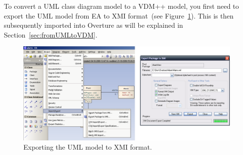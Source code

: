 To convert a UML class diagram model to a VDM++ model, you first need
to export the UML model from EA to XMI format~(see Figure~\ref{fig:xmiexport}). This
is then subsequently imported into Overture as will be explained in Section~\ref{sec:fromUMLtoVDM}.

\begin{figure}[htbp]
\begin{center}
\includegraphics[width=4.5in]{figures/xmiexport}
\caption{Exporting the UML model to XMI format.\label{fig:xmiexport}}
\end{center}
\end{figure}


 


